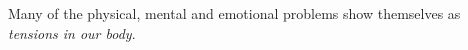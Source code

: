\documentclass[../main.tex]{subfiles}
\begin{document}
\label{Ex:Dynamind}
Many of the physical, mental and emotional problems show themselves as \emph{tensions in our body}.
\end{document}
